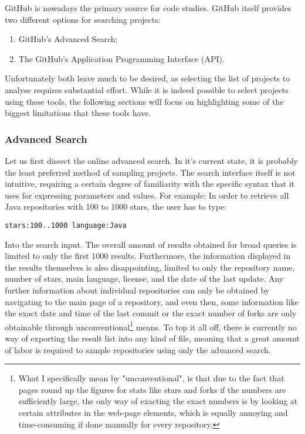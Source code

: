 GitHub is nowadays the primary source for code studies.
GitHub itself provides two different options for searching projects:
\begin{enumerate}
    \item GitHub's Advanced Search;
    \item The GitHub's Application Programming Interface (API)\@.
\end{enumerate}
Unfortunately both leave much to be desired, as selecting the list of projects to analyse requires substantial effort.
While it is indeed possible to select projects using these tools, the following sections will focus on highlighting some of the biggest limitations that these tools have.

\subsubsection{Advanced Search}

Let us first dissect the online advanced search.
In it's current state, it is probably the least preferred method of sampling projects.
The search interface itself is not intuitive, requiring a certain degree of familiarity with the specific syntax that it uses for expressing parameters and values.
For example: In order to retrieve all Java repositories with 100 to 1000 stars, the user has to type:
\begin{verbatim}
stars:100..1000 language:Java
\end{verbatim}
Into the search input.
The overall amount of results obtained for broad queries is limited to only the first 1000 results.
Furthermore, the information displayed in the results themselves is also disappointing, limited to only the repository name, number of stars, main language, license, and the date of the last update.
Any further information about individual repositories can only be obtained by navigating to the main page of a repository, and even then, some information like the exact date and time of the last commit or the exact number of forks are only obtainable through unconventional\footnote{What I specifically mean by "unconventional", is that due to the fact that pages round up the figures for stats like stars and forks if the numbers are sufficiently large, the only way of exacting the exact numbers is by looking at certain attributes in the web-page elements, which is equally annoying and time-consuming if done manually for every repository.} means.
To top it all off, there is currently no way of exporting the result list into any kind of file, meaning that a great amount of labor is required to sample repositories using only the advanced search.


